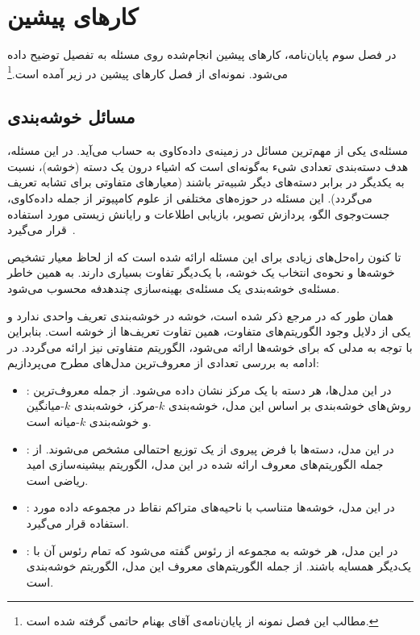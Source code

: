 
\chapter{کارهای پیشین}

در فصل سوم پایان‌نامه، کارهای پیشین انجام‌شده روی مسئله به تفصیل توضیح داده می‌شود.
نمونه‌ای از فصل کارهای پیشین در زیر آمده است.\footnote{
مطالب این فصل نمونه از پایان‌نامه‌ی آقای بهنام حاتمی گرفته شده است.}


\section{مسائل خوشه‌بندی}

مسئله‌ی  یکی از مهم‌ترین مسائل در زمینه‌ی داده‌کاوی به حساب می‌آید.
در این مسئله، هدف دسته‌بندی تعدادی شیء به‌گونه‌ای است که اشیاء درون یک دسته (خوشه)، نسبت به یکدیگر در برابر دسته‌های دیگر شبیه‌تر باشند (معیارهای متفاوتی برای تشابه تعریف می‌گردد).
این مسئله در حوزه‌های مختلفی از علوم کامپیوتر از جمله داده‌کاوی، جست‌وجوی الگو، پردازش تصویر، بازیابی اطلاعات و رایانش زیستی مورد استفاده قرار می‌گیرد~\cite{han2006}.

تا کنون راه‌حل‌های زیادی برای این مسئله ارائه شده است که از لحاظ معیار تشخیص خوشه‌ها و نحوه‌ی انتخاب یک خوشه، با یک‌دیگر تفاوت بسیاری دارند.
به همین خاطر مسئله‌ی خوشه‌بندی یک مسئله‌ی بهینه‌سازی چندهدفه محسوب می‌شود.


همان طور که در مرجع \cite{estivill2002so} ذکر شده است، خوشه در خوشه‌بندی تعریف واحدی ندارد و یکی از دلایل وجود الگوریتم‌های متفاوت، همین تفاوت تعریف‌ها از خوشه است.
بنابراین با توجه به مدلی که برای خوشه‌ها ارائه می‌شود، الگوریتم متفاوتی نیز ارائه می‌گردد.
در ادامه به بررسی تعدادی از معروف‌ترین مدل‌های مطرح می‌پردازیم:

\begin{itemize}

\item
{}: در این مدل‌ها، هر دسته با یک مرکز نشان داده می‌شود.
از جمله معروف‌ترین روش‌های خوشه‌بندی بر اساس این مدل،  خوشه‌بندی $k$-مرکز، خوشه‌بندی $k$-میانگین و خوشه‌بندی $k$-میانه است.

\item
{}: در این مدل، دسته‌ها با فرض پیروی از یک توزیع احتمالی مشخص می‌شوند.
از جمله الگوریتم‌های معروف ارائه شده در این مدل، الگوریتم بیشینه‌سازی امید ریاضی است.

\item
{}: در این مدل، خوشه‌ها متناسب با ناحیه‌های متراکم نقاط در مجموعه داده مورد استفاده قرار می‌گیرد.

\item
{}: در این مدل، هر خوشه به مجموعه از رئوس گفته می‌شود که تمام رئوس آن با یک‌دیگر همسایه باشند.
از جمله الگوریتم‌های معروف این مدل، الگوریتم خوشه‌بندی  است.

\end{itemize}

